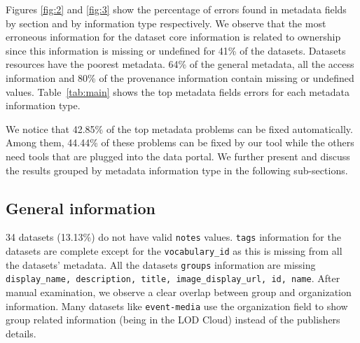 \documentclass[runningheads,a4paper]{llncs}
\begin{document}
Figures \ref{fig:2} and \ref{fig:3} show the percentage of errors found in metadata fields by section and by information type respectively. We observe that the most erroneous information for the dataset core information is related to ownership since this information is missing or undefined for 41\% of the datasets. Datasets resources have the poorest metadata. 64\% of the general metadata, all the access information and 80\% of the provenance information contain missing or undefined values. Table~\ref{tab:main} shows the top metadata fields errors for each metadata information type.

We notice that 42.85\% of the top metadata problems can be fixed automatically. Among them, 44.44\% of these problems can be fixed by our tool while the others need tools that are plugged into the data portal. We further present and discuss the results grouped by metadata information type in the following sub-sections.

\subsection{General information}
34 datasets (13.13\%) do not have valid \texttt{notes} values. \texttt{tags} information for the datasets are complete except for the \texttt{vocabulary\_id} as this is missing from all the datasets' metadata. All the datasets \texttt{groups} information are missing \texttt{display\_name, description, title, image\_display\_url, id, name}. After manual examination, we observe a clear overlap between group and organization information. Many datasets like \texttt{event-media} use the organization field to show group related information (being in the LOD Cloud) instead of the publishers details.
\end{document}

